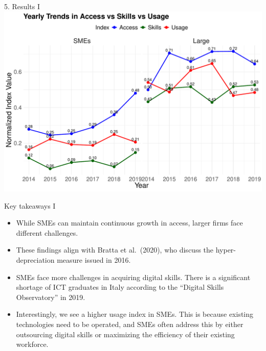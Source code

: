 \documentclass[
  ignorenonframetext,
]{beamer}
\begin{document}
\begin{frame}{5. Results I}
\label{results-i}
\includegraphics{FactoAnalysisDigitalDivide_files/figure-beamer/yearTrendSize-1.pdf}
\end{frame}

\begin{frame}{Key takeaways I}
\label{key-takeaways-i}
\begin{itemize}
\item
  While SMEs can maintain continuous growth in access, larger firms face
  different challenges.
\item
  These findings align with Bratta et al.~(2020), who discuss the
  hyper-depreciation measure issued in 2016.
\item
  SMEs face more challenges in acquiring digital skills. There is a
  significant shortage of ICT graduates in Italy according to the
  ``Digital Skills Observatory'' in 2019.
\item
  Interestingly, we see a higher usage index in SMEs. This is because
  existing technologies need to be operated, and SMEs often address this
  by either outsourcing digital skills or maximizing the efficiency of
  their existing workforce.
\end{itemize}
\end{frame}
\end{document}
